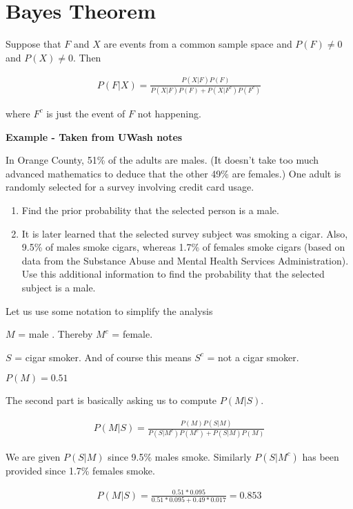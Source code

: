 \documentclass[12pt]{article}
\begin{document}
\section*{Bayes Theorem}

Suppose that $F$ and $X$ are events from a common sample space and $P(F) \neq 0$ and $P(X) \neq 0$. Then

\begin{align*}
P(F|X) = \frac{P(X|F)P(F)}{P(X|F)P(F) + P(X|F^c)P(F^c)}
\end{align*}

where $F^c$ is just the event of $F$ not happening.

\textbf{Example - Taken from UWash notes}

In Orange County, 51\% of the adults are males. (It doesn't take too much advanced
mathematics to deduce that the other 49\% are females.) One adult is randomly selected
for a survey involving credit card usage.
\begin{enumerate}
\item Find the prior probability that the selected person is a male.
\item It is later learned that the selected survey subject was smoking a cigar. Also, 9.5\%
of males smoke cigars, whereas 1.7\% of females smoke cigars (based on data
from the Substance Abuse and Mental Health Services Administration). Use this
additional information to find the probability that the selected subject is a male.
\end{enumerate}

Let us use some notation to simplify the analysis

$M$ = male . Thereby $M^c$ = female. 

$S$ = cigar smoker. And of course this means $S^c$ = not a cigar smoker.

$P(M) = 0.51$

The second part is basically asking us to compute $P(M|S)$.

\begin{align*}
P(M|S) = \frac{P(M) P(S|M)}{P(S|M^c) P(M^c) + P(S|M) P(M)}
\end{align*}

We are given $P(S|M)$ since 9.5\% males smoke. Similarly $P(S|M^c)$ has been provided since 1.7\% females smoke.

\begin{align*}
P(M|S) = \frac{0.51 * 0.095}{0.51 * 0.095 + 0.49 * 0.017}
= 0.853
\end{align*}
\end{document}
